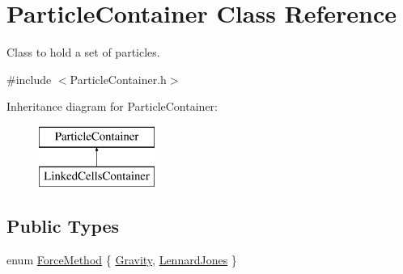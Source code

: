 \hypertarget{classParticleContainer}{}\section{Particle\+Container Class Reference}
\label{classParticleContainer}


Class to hold a set of particles.  




{\ttfamily \#include $<$Particle\+Container.\+h$>$}

Inheritance diagram for Particle\+Container\+:\begin{figure}[H]
\begin{center}
\leavevmode
\includegraphics[height=2.000000cm]{classParticleContainer}
\end{center}
\end{figure}
\subsection*{Public Types}
\begin{DoxyCompactItemize}
\item 
enum \hyperlink{classParticleContainer_a2457078eafdf0fdd9eeb977e63aed6e8}{Force\+Method} \{ \hyperlink{classParticleContainer_a2457078eafdf0fdd9eeb977e63aed6e8aafc56f60001e371709e979276a58ead8}{Gravity}, 
\hyperlink{classParticleContainer_a2457078eafdf0fdd9eeb977e63aed6e8ada3883b657ac8c6a175c7946f0514e8e}{Lennard\+Jones}
 \}
\end{DoxyCompactItemize}
